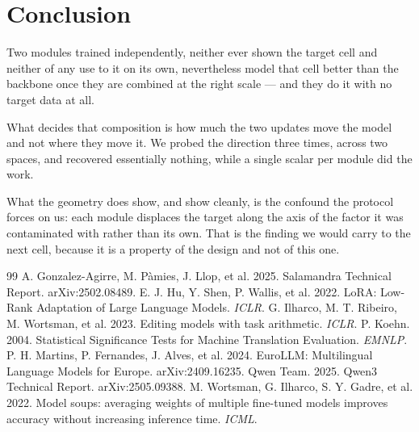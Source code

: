 \documentclass[10pt,twocolumn,a4paper]{article}
\begin{document}
\section{Conclusion}

Two modules trained independently, neither ever shown the target cell and
neither of any use to it on its own, nevertheless model that cell better than
the backbone once they are combined at the right scale --- and they do it with
no target data at all.

What decides that composition is how much the two updates move the model and
not where they move it. We probed the direction three times, across two spaces,
and recovered essentially nothing, while a single scalar per module did the
work.

What the geometry does show, and show cleanly, is the confound the protocol
forces on us: each module displaces the target along the axis of the factor it
was contaminated with rather than its own. That is the finding we would carry to
the next cell, because it is a property of the design and not of this one.

\begin{thebibliography}{99}\footnotesize
\setlength{\itemsep}{1pt}
 A. Gonzalez-Agirre, M. P\`amies, J. Llop, et al. 2025.
Salamandra Technical Report. arXiv:2502.08489.
 E. J. Hu, Y. Shen, P. Wallis, et al. 2022. LoRA: Low-Rank
Adaptation of Large Language Models. \emph{ICLR}.
 G. Ilharco, M. T. Ribeiro, M. Wortsman, et al. 2023.
Editing models with task arithmetic. \emph{ICLR}.
 P. Koehn. 2004. Statistical Significance Tests for Machine
Translation Evaluation. \emph{EMNLP}.
 P. H. Martins, P. Fernandes, J. Alves, et al. 2024.
EuroLLM: Multilingual Language Models for Europe. arXiv:2409.16235.
 Qwen Team. 2025. Qwen3 Technical Report. arXiv:2505.09388.
 M. Wortsman, G. Ilharco, S. Y. Gadre, et al. 2022. Model
soups: averaging weights of multiple fine-tuned models improves accuracy without
increasing inference time. \emph{ICML}.
\end{thebibliography}
\end{document}
